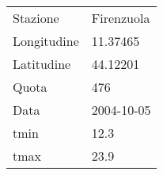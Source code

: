 
\begin{tabular}[t]{ll}
  \toprule
  Stazione & Firenzuola\\
  Longitudine & 11.37465\\
  Latitudine & 44.12201\\
  Quota & 476\\
  Data & 2004-10-05\\
  \addlinespace
  tmin & 12.3\\
  tmax & 23.9\\
  \bottomrule
\end{tabular}